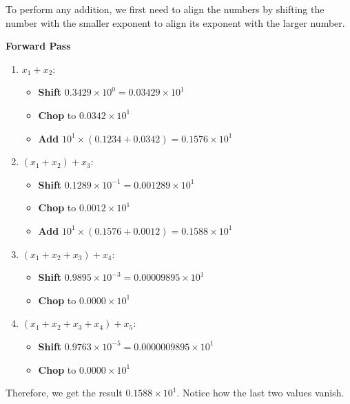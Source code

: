 To perform any addition, we first need to align the numbers by shifting the number with the smaller exponent to align its exponent with the larger number.

\textbf{Forward Pass}
\begin{enumerate}
	\item $x_1 + x_2$: \begin{itemize}
		\item \textbf{Shift} $0.3429 \times 10^0 = 0.03429 \times 10^1$
		\item \textbf{Chop} to $0.0342 \times 10^1$
		\item \textbf{Add} $10^1 \times (0.1234 + 0.0342) = 0.1576 \times 10^1$
	\end{itemize}

	\item $(x_1 + x_2) + x_3$: \begin{itemize}
		\item \textbf{Shift} $0.1289 \times 10^{-1} = 0.001289 \times 10^1$
		\item \textbf{Chop} to $0.0012 \times 10^1$
		\item \textbf{Add} $10^1 \times (0.1576 + 0.0012) = 0.1588 \times 10^1$
	\end{itemize}

	\item $(x_1 + x_2 + x_3) + x_4$: \begin{itemize}
		\item \textbf{Shift} $0.9895 \times 10^{-3} = 0.00009895 \times 10^1$
		\item \textbf{Chop} to $0.0000 \times 10^1$
	\end{itemize}

	\item $(x_1 + x_2 + x_3 + x_4) + x_5$: \begin{itemize}
		\item \textbf{Shift} $0.9763 \times 10^{-5} = 0.0000009895 \times 10^1$
		\item \textbf{Chop} to $0.0000 \times 10^1$
	\end{itemize}
\end{enumerate}

Therefore, we get the result $0.1588 \times 10^1$. Notice how the last two values vanish.

